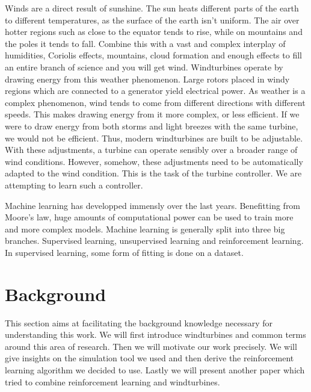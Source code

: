 \documentclass[hyperref,beleg]{cgvpub}
\begin{document}
Winds are a direct result of sunshine. The sun heats different parts of the earth to different temperatures, as the surface of the earth isn't uniform. The air over hotter regions such as close to the equator tends to rise, while on mountains and the poles it tends to fall. Combine this with a vast and complex interplay of humidities, Coriolis effects, mountains, cloud formation and enough effects to fill an entire branch of science and you will get wind. Windturbines operate by drawing energy from this weather phenomenon. Large rotors placed in windy regions which are connected to a generator yield electrical power. As weather is a complex phenomenon, wind tends to come from different directions with different speeds. This makes drawing energy from it more complex, or less efficient. If we were to draw energy from both storms and light breezes with the same turbine, we would not be efficient. Thus, modern windturbines are built to be adjustable. With these adjustments, a turbine can operate sensibly over a broader range of wind conditions. However, somehow, these adjustments need to be automatically adapted to the wind condition. This is the task of the turbine controller. We are attempting to learn such a controller.

Machine learning has developped immensly over the last years. Benefitting from Moore's law, huge amounts of computational power can be used to train more and more complex models. Machine learning is generally split into three big branches. Supervised learning, unsupervised learning and reinforcement learning. In supervised learning, some form of fitting is done on a dataset. 



\chapter{Background}

This section aims at facilitating the background knowledge necessary for understanding this work. We will first introduce windturbines and common terms around this area of research. Then we will motivate our work precisely. We will give insights on the simulation tool we used and then derive the reinforcement learning algorithm we decided to use. Lastly we will present another paper which tried to combine reinforcement learning and windturbines.
\end{document}
